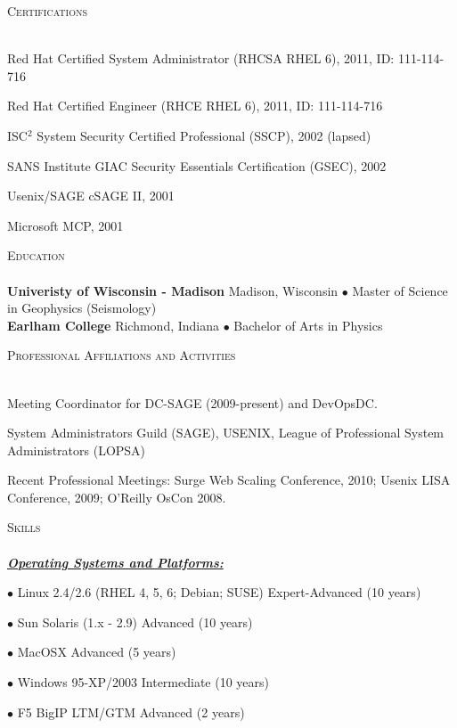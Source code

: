 \documentclass{article}
\newcommand{\lineunder}{\vspace*{-8pt} \\ \hspace*{-18pt} \hrulefill \\}
\newcommand{\header}[1]{{\hspace*{-15pt}\vspace*{6pt} \textsc{#1}} \vspace*{-6pt} \lineunder}
\newcommand{\skillset}[1]{{ \underline{\textbf{\emph{#1}}}\\  \nopagebreak }}
\newcommand{\skill}[2]{{$\bullet$ #1 \hfill #2 }}
\newenvironment{achievements}{\begin{list}{\topsep 0pt \itemsep -2pt}} {\vspace*{4pt}\end{list}}
\newcommand{\school}[3]{
 \textbf{#1} #2 $\bullet$ #3\\ 
}
\begin{document}
\header{Certifications}
\begin{achievements}
\item Red Hat Certified System Administrator (RHCSA RHEL 6), 2011, ID: 111-114-716
\item Red Hat Certified Engineer (RHCE RHEL 6), 2011, ID: 111-114-716
\item ISC$^{2}$ System Security Certified Professional (SSCP), 2002 (lapsed)
\item SANS Institute GIAC Security Essentials Certification (GSEC), 2002
\item Usenix/SAGE cSAGE II, 2001
\item Microsoft MCP, 2001
\end{achievements}

\header{Education}

\school{Univeristy of Wisconsin - Madison}{Madison, Wisconsin} {Master of Science in Geophysics (Seismology)}
\school{Earlham College}{Richmond, Indiana}{Bachelor of Arts in Physics}
\vspace{18pt}

\header{Professional Affiliations and Activities}
\begin{achievements}
\item Meeting Coordinator for DC-SAGE (2009-present) and DevOpsDC.
\item System Administrators Guild (SAGE), USENIX, League of Professional System Administrators (LOPSA) 
\item Recent Professional Meetings: Surge Web Scaling Conference, 2010; Usenix LISA Conference, 2009; O'Reilly OsCon 2008.
\end{achievements}


\header{Skills}

\skillset{Operating Systems and Platforms: }

\skill{Linux 2.4/2.6 (RHEL 4, 5, 6; Debian; SUSE)}{Expert-Advanced (10 years)}

\skill{Sun Solaris (1.x - 2.9)}{Advanced (10 years)}

\skill{MacOSX}{Advanced (5 years)}

\skill{Windows 95-XP/2003}{Intermediate (10 years)}

\skill{F5 BigIP LTM/GTM}{Advanced (2 years)}
\end{document}
